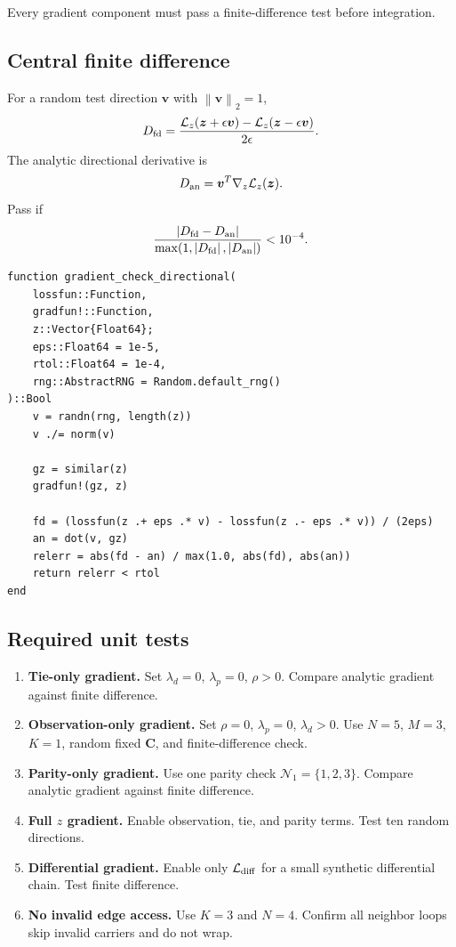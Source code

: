 \documentclass[11pt]{article}
\newcommand{\norm}[1]{\left\lVert #1 \right\rVert}
\newcommand{\abs}[1]{\left\lvert #1 \right\rvert}
\begin{document}
Every gradient component must pass a finite-difference test before integration.

\subsection{Central finite difference}

For a random test direction $\bm v$ with $\norm{\bm v}_2=1$,
\begin{equation}
D_{\rm fd}=\frac{\mathcal L_z(\bm z+\epsilon\bm v)-\mathcal L_z(\bm z-\epsilon\bm v)}{2\epsilon}.
\end{equation}
The analytic directional derivative is
\begin{equation}
D_{\rm an}=\bm v^T\nabla_z\mathcal L_z(\bm z).
\end{equation}
Pass if
\begin{equation}
\frac{\abs{D_{\rm fd}-D_{\rm an}}}{\max(1,\abs{D_{\rm fd}},\abs{D_{\rm an}})}<10^{-4}.
\end{equation}

\begin{lstlisting}
function gradient_check_directional(
    lossfun::Function,
    gradfun!::Function,
    z::Vector{Float64};
    eps::Float64 = 1e-5,
    rtol::Float64 = 1e-4,
    rng::AbstractRNG = Random.default_rng()
)::Bool
    v = randn(rng, length(z))
    v ./= norm(v)

    gz = similar(z)
    gradfun!(gz, z)

    fd = (lossfun(z .+ eps .* v) - lossfun(z .- eps .* v)) / (2eps)
    an = dot(v, gz)
    relerr = abs(fd - an) / max(1.0, abs(fd), abs(an))
    return relerr < rtol
end
\end{lstlisting}

\subsection{Required unit tests}

\begin{enumerate}[label=\textbf{G\arabic*.},leftmargin=*]
\item \textbf{Tie-only gradient.}  Set $\lambda_d=0$, $\lambda_p=0$, $\rho>0$.  Compare analytic gradient against finite difference.
\item \textbf{Observation-only gradient.}  Set $\rho=0$, $\lambda_p=0$, $\lambda_d>0$.  Use $N=5$, $M=3$, $K=1$, random fixed $\mathbf C$, and finite-difference check.
\item \textbf{Parity-only gradient.}  Use one parity check $\mathcal N_1=\{1,2,3\}$.  Compare analytic gradient against finite difference.
\item \textbf{Full $z$ gradient.}  Enable observation, tie, and parity terms.  Test ten random directions.
\item \textbf{Differential gradient.}  Enable only $\mathcal L_{\rm diff}$ for a small synthetic differential chain.  Test finite difference.
\item \textbf{No invalid edge access.}  Use $K=3$ and $N=4$.  Confirm all neighbor loops skip invalid carriers and do not wrap.
\end{enumerate}
\end{document}
